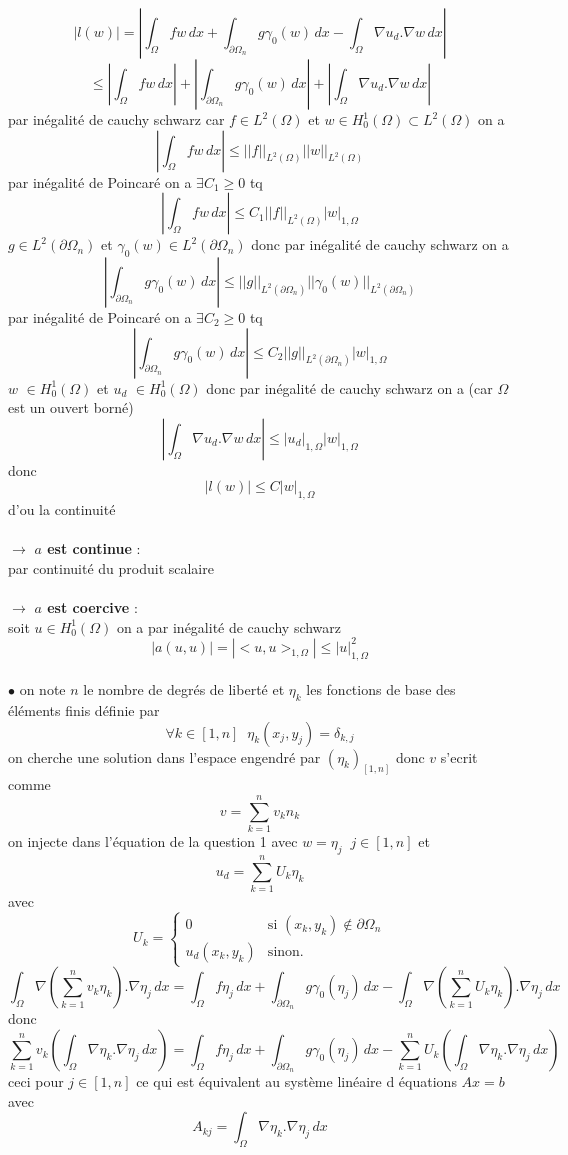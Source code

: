 \documentclass{article}
\begin{document}
$$
|l(w)| = |\int_{\Omega} f w \,dx + \int_{\partial \Omega_{n}} g \gamma_{0}(w) \,dx - \int_{\Omega} \nabla u_d . \nabla w \,dx|
$$
$$
\leq |\int_{\Omega} f w \,dx| + |\int_{\partial \Omega_{n}} g \gamma_{0}(w) \,dx| + |\int_{\Omega} \nabla u_d . \nabla w \,dx|
$$
par inégalité de cauchy schwarz car $f \in L^2(\Omega)$ et $w \in H_{0}^{1}(\Omega) \subset L^2(\Omega)$ on a
$$
|\int_{\Omega} f w \,dx| \leq ||f||_{L^2(\Omega)} ||w||_{L^2(\Omega)} 
$$
par inégalité de Poincaré on a $\exists C_1 \geq 0$ tq
$$
|\int_{\Omega} f w \,dx| \leq C_1 ||f||_{L^2(\Omega)} |w|_{1, \Omega} 
$$
$g \in L^2(\partial \Omega_n)$ et $\gamma_{0}(w) \in L^2(\partial \Omega_n)$ donc par inégalité de cauchy schwarz on a
$$
|\int_{\partial \Omega_{n}} g \gamma_{0}(w) \,dx| \leq ||g||_{L^2(\partial \Omega_n)} ||\gamma_{0}(w)||_{L^2(\partial \Omega_n)}
$$
par inégalité de Poincaré on a $\exists C_2 \geq 0$ tq
$$
|\int_{\partial \Omega_{n}} g \gamma_{0}(w) \,dx| \leq C_2 ||g||_{L^2(\partial \Omega_n)} |w|_{1, \Omega}
$$
$w$ $\in H_{0}^{1}(\Omega)$ et $u_d$ $\in H_{0}^{1}(\Omega)$ donc par inégalité de cauchy schwarz on a (car $\Omega$ est un ouvert borné)
$$
|\int_{\Omega} \nabla u_d . \nabla w \,dx| \leq |u_d|_{1, \Omega} |w|_{1, \Omega}
$$
donc 
$$
|l(w)| \leq C |w|_{1, \Omega}
$$
d'ou la continuité \\ \\
$\rightarrow$ \textbf{$a$ est continue} : \\
par continuité du produit scalaire \\ \\
$\rightarrow$ \textbf{$a$ est coercive} : \\
soit $u \in H_{0}^{1}(\Omega)$ on a par inégalité de cauchy schwarz
$$
|a(u, u)| = |<u, u>_{1, \Omega}| \leq |u|^{2}_{1, \Omega}
$$
\\
$\bullet$ on note $n$ le nombre de degrés de liberté et $\eta_k$ les fonctions de base des éléments finis définie par 
$$
\forall k \in [1, n] \; \; \eta_k(x_j, y_j) = \delta_{k, j} 
$$
on cherche une solution dans l'espace engendré par $(\eta_{k})_{[1, n]}$ donc $v$ s'ecrit comme 
$$
v = \sum_{k=1}^{n} v_k n_k
$$
on injecte dans l'équation de la question 1 avec $w = \eta_j \; \; j \in [1, n]$ et 
$$
u_d = \sum_{k=1}^{n} U_k \eta_k
$$
avec 
$$
U_k = \left\{
    \begin{array}{ll}
        0 & \mbox{si } (x_k, y_k) \notin \partial \Omega_{n} \\
        u_d(x_k, y_k) & \mbox{sinon.}
    \end{array}
\right.
$$
$$
\int_{\Omega} \nabla (\sum_{k=1}^{n} v_k \eta_k) . \nabla \eta_j \,dx = \int_{\Omega} f \eta_j \,dx + \int_{\partial \Omega_{n}} g \gamma_{0}(\eta_j) \,dx - \int_{\Omega} \nabla (\sum_{k=1}^{n} U_k \eta_k) . \nabla \eta_j \,dx
$$
donc 
$$
\sum_{k=1}^{n} v_k (\int_{\Omega} \nabla \eta_k . \nabla \eta_j \,dx) = \int_{\Omega} f \eta_j \,dx + \int_{\partial \Omega_{n}} g \gamma_{0}(\eta_j) \,dx - \sum_{k=1}^{n} U_k (\int_{\Omega} \nabla \eta_k . \nabla \eta_j \,dx)
$$
ceci pour $j \in [1, n]$ ce qui est équivalent au système linéaire d équations $\boxed{Ax = b}$ avec 
$$
A_{kj} = \int_{\Omega} \nabla \eta_k . \nabla \eta_j \,dx
$$
\end{document}

